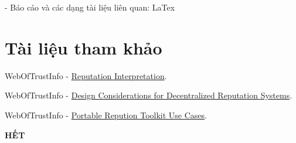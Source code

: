 \documentclass[a4paper, 12pt]{article}	 %
\begin{document}
- Báo cáo và các dạng tài liệu liên quan: LaTex

\section*{Tài liệu tham khảo}
WebOfTrustInfo - \href{https://github.com/WebOfTrustInfo/rwot9-prague/blob/master/final-documents/reputation-interpretation.pdf}{Reputation Interpretation}.
\vspace{4pt}

WebOfTrustInfo - \href{https://github.com/WebOfTrustInfo/rwot4-paris/blob/master/final-documents/reputation-design.pdf}{Design Considerations for Decentralized Reputation Systems}.
\vspace{4pt}

WebOfTrustInfo - \href{https://github.com/WebOfTrustInfo/rwot3-sf/blob/master/final-documents/reputation-toolkit.pdf}{Portable Repution Toolkit Use Cases}.

\vfill 
\begin{center}
    \textbf{\Huge HẾT}
\end{center}
\end{document}

